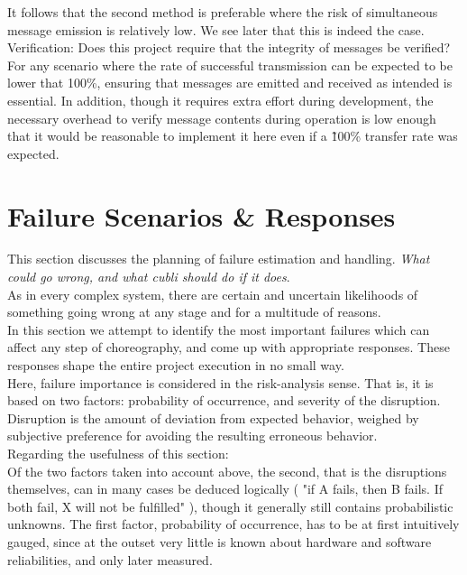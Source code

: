 It follows that the second method is preferable where the risk of simultaneous message emission is relatively low. We see later that this is indeed the case. \\


Verification: Does this project require that the integrity of messages be verified? For any scenario where the rate of successful transmission can be expected to be lower that 100\%, ensuring that messages are emitted and received as intended is essential. In addition, though it requires extra effort during development, the necessary overhead to verify message contents during operation is low enough that it would be reasonable to implement it here even if a \~100\% transfer rate was expected.




\section{Failure Scenarios \& Responses}
This section discusses the planning of failure estimation and handling.
\textit{What could go wrong, and what cubli should do if it does}.\\

As in every complex system, there are certain and uncertain likelihoods of something going wrong at any stage and for a multitude of reasons.\\

In this section we attempt to identify the most important failures which can affect any step of choreography, and come up with appropriate responses. These responses shape the entire project execution in no small way.\\

Here, failure importance is considered in the risk-analysis sense. That is, it is based on two factors: probability of occurrence, and severity of the disruption. Disruption is the amount of deviation from expected behavior, weighed by subjective preference for avoiding the resulting erroneous behavior. \\

Regarding the usefulness of this section:\\

Of the two factors taken into account above, the second, that is the disruptions themselves, can in many cases be deduced logically ( "if A fails, then B fails. If both fail, X will not be fulfilled" ), though it generally still contains probabilistic unknowns. The first factor, probability of occurrence, has to be at first intuitively gauged, since at the outset very little is known about hardware and software reliabilities, and only later measured.\\

